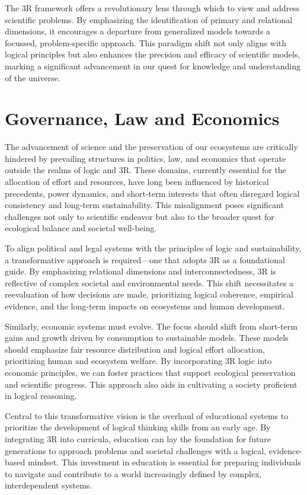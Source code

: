 \documentclass[12pt]{article}
\begin{document}
The 3R framework offers a revolutionary lens through which to view and address scientific problems. By emphasizing the identification of primary and relational dimensions, it encourages a departure from generalized models towards a focussed, problem-specific approach. This paradigm shift not only aligns with logical principles but also enhances the precision and efficacy of scientific models, marking a significant advancement in our quest for knowledge and understanding of the universe.

\section*{Governance, Law and Economics}

The advancement of science and the preservation of our ecosystems are critically hindered by prevailing structures in politics, law, and economics that operate outside the realms of logic and 3R. These domains, currently essential for the allocation of effort and resources, have long been influenced by historical precedents, power dynamics, and short-term interests that often disregard logical consistency and long-term sustainability. This misalignment poses significant challenges not only to scientific endeavor but also to the broader quest for ecological balance and societal well-being.

To align political and legal systems with the principles of logic and sustainability, a transformative approach is required—one that adopts 3R as a foundational guide. By emphasizing relational dimensions and interconnectedness, 3R is reflective of complex societal and environmental needs. This shift necessitates a reevaluation of how decisions are made, prioritizing logical coherence, empirical evidence, and the long-term impacts on ecosystems and human development.

Similarly, economic systems must evolve. The focus should shift from short-term gains and growth driven by consumption to sustainable models. These models should emphasize fair resource distribution and logical effort allocation, prioritizing human and ecosystem welfare. By incorporating 3R logic into economic principles, we can foster practices that support ecological preservation and scientific progress. This approach also aids in cultivating a society proficient in logical reasoning.


Central to this transformative vision is the overhaul of educational systems to prioritize the development of logical thinking skills from an early age. By integrating 3R into curricula, education can lay the foundation for future generations to approach problems and societal challenges with a logical, evidence-based mindset. This investment in education is essential for preparing individuals to navigate and contribute to a world increasingly defined by complex, interdependent systems.
\end{document}
